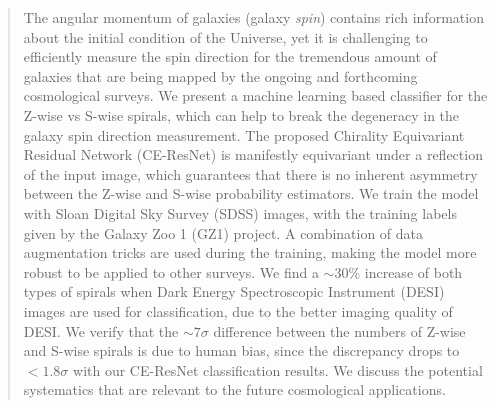 \documentclass[twocolumn]{aastex631}
\begin{document}
\begin{abstract}

The angular momentum of galaxies (galaxy \textit{spin}) contains rich information about the initial condition of the Universe, yet it is challenging to efficiently measure the spin direction for the tremendous amount of galaxies that are being mapped by the ongoing and forthcoming cosmological surveys.
We present a machine learning based classifier for the Z-wise vs S-wise spirals, which can help to break the degeneracy in the galaxy spin direction measurement.
The proposed Chirality Equivariant Residual Network (CE-ResNet) is manifestly equivariant under a reflection of the input image, which guarantees that there is no inherent asymmetry between the Z-wise and S-wise probability estimators.
We train the model with Sloan Digital Sky Survey (SDSS) images, with the training labels given by the Galaxy Zoo 1 (GZ1) project.
A combination of data augmentation tricks are used during the training, making the model more robust to be applied to other surveys.
We find a $\sim\!30\%$ increase of both types of spirals when Dark Energy Spectroscopic Instrument (DESI) images are used for classification, due to the better imaging quality of DESI.
We verify that the $\sim\!7\sigma$ difference between the numbers of Z-wise and S-wise spirals is due to human bias, since the discrepancy drops to $<\!1.8\sigma$ with our CE-ResNet classification results.
We discuss the potential systematics that are relevant to the future cosmological applications.


\end{abstract}

\end{document}
